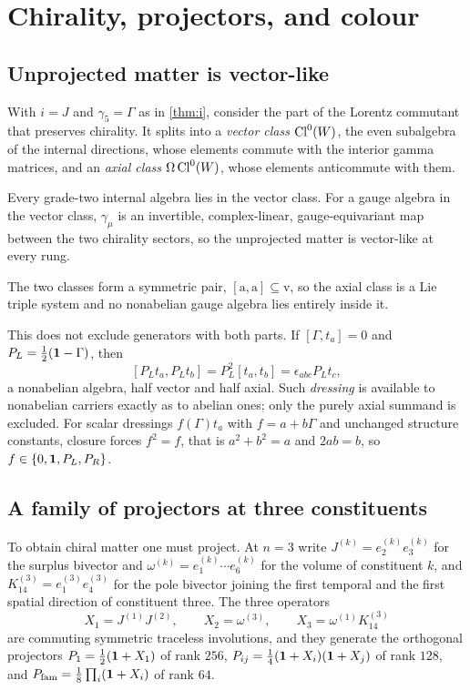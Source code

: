 \section{Chirality, projectors, and colour}
\label{sec:projectors}

\subsection{Unprojected matter is vector-like}

With $i=J$ and $\gamma_5=\Gamma$ as in \cref{thm:i}, consider the part of the Lorentz commutant that preserves chirality. It splits
into a \emph{vector class} $\mathrm{Cl}^0(W)$, the even subalgebra of the internal directions, whose elements commute with the interior gamma
matrices, and an \emph{axial class} $\Omega\,\mathrm{Cl}^0(W)$, whose elements anticommute with them.

\begin{proposition}
\label{prop:vectorlike}
Every grade-two internal algebra lies in the vector class. For a gauge algebra in the vector class, $\gamma_\mu$ is an invertible,
complex-linear, gauge-equivariant map between the two chirality sectors, so the unprojected matter is vector-like at every rung.
\end{proposition}

\begin{proposition}
\label{prop:axialtriple}
The two classes form a symmetric pair, $[\mathrm a,\mathrm a]\subseteq\mathrm v$, so the axial class is a Lie triple system and no
nonabelian gauge algebra lies entirely inside it.
\end{proposition}

This does not exclude generators with both parts. If $[\Gamma,t_a]=0$ and $P_L=\tfrac12(\mathbf 1-\Gamma)$, then
\[
[P_Lt_a,P_Lt_b]=P_L^2[t_a,t_b]=\epsilon_{abc}P_Lt_c ,
\]
a nonabelian algebra, half vector and half axial. Such \emph{dressing} is available to nonabelian carriers exactly as to abelian ones;
only the purely axial summand is excluded. For scalar dressings $f(\Gamma)t_a$ with $f=a+b\Gamma$ and unchanged structure constants,
closure forces $f^2=f$, that is $a^2+b^2=a$ and $2ab=b$, so $f\in\{0,\mathbf 1,P_L,P_R\}$.

\subsection{A family of projectors at three constituents}

To obtain chiral matter one must project. At $n=3$ write $J^{(k)}=e^{(k)}_2e^{(k)}_3$ for the surplus bivector and
$\omega^{(k)}=e^{(k)}_1\cdots e^{(k)}_6$ for the volume of constituent $k$, and $K^{(3)}_{14}=e^{(3)}_1e^{(3)}_4$ for the pole bivector
joining the first temporal and the first spatial direction of constituent three. The three operators
\[
X_1=J^{(1)}J^{(2)},\qquad X_2=\omega^{(3)},\qquad X_3=\omega^{(1)}K^{(3)}_{14}
\]
are commuting symmetric traceless involutions, and they generate the orthogonal projectors $P_1=\tfrac12(\mathbf 1+X_1)$ of rank $256$,
$P_{ij}=\tfrac14(\mathbf 1+X_i)(\mathbf 1+X_j)$ of rank $128$, and $P_{\rm fam}=\tfrac18\prod_i(\mathbf 1+X_i)$ of rank $64$.

